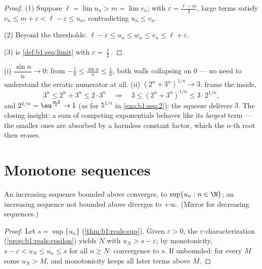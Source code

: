 \begin{proof}
(1) Suppose $\ell = \lim u_n > m = \lim v_n$; with $\varepsilon =
\frac{\ell - m}{3}$, large terms satisfy $v_n \leq m + \varepsilon <
\ell - \varepsilon \leq u_n$, contradicting $u_n \leq v_n$.

(2) Beyond the thresholds: $\ell - \varepsilon \leq u_n \leq w_n \leq
v_n \leq \ell + \varepsilon$.

(3) is \cref{def:b1:seq:limit} with $\varepsilon = \frac\ell2$.
\end{proof}

\begin{example}\label{ex:b1:seq:squeezes}
(i) $\dfrac{\sin n}{n} \to 0$: from $-\frac1n \leq \frac{\sin
n}{n} \leq \frac1n$, both walls collapsing on $0$ --- no need to
understand the erratic numerator at all. (ii) $(2^n +
3^n)^{1/n} \to 3$: frame the inside,
\[
3^n \leq 2^n + 3^n \leq 2\cdot3^n
\quad\Longrightarrow\quad
3 \leq (2^n + 3^n)^{1/n} \leq 3\cdot 2^{1/n} ,
\]
and $2^{1/n} = \eu^{\frac{\ln 2}{n}} \to 1$ (as for $5^{1/n}$ in
\cref{exo:b1:seq:2}): the squeeze delivers $3$. The closing
insight: a sum of competing exponentials behaves like its
\emph{largest} term --- the smaller ones are absorbed by a
harmless constant factor, which the $n$-th root then erases.
\end{example}

\section{Monotone sequences}

\begin{theorem}\label{thm:b1:seq:monotone}
An increasing sequence bounded above converges, to $\sup\{u_n : n \in
\N\}$; an increasing sequence not bounded above diverges to
$+\infty$. (Mirror  for decreasing
sequences.)
\end{theorem}

\begin{proof}
Let $s = \sup\{u_n\}$ (\cref{thm:b1:reals:sup}). Given $\varepsilon >
0$, the $\varepsilon$-characterization
(\cref{prop:b1:reals:epsilon}) yields $N$ with $u_N > s -
\varepsilon$; by monotonicity, $s - \varepsilon < u_N \leq u_n \leq
s$ for all $n \geq N$: convergence to $s$. If unbounded: for every
$M$ some $u_N > M$, and monotonicity keeps all later terms above $M$.
\end{proof}

